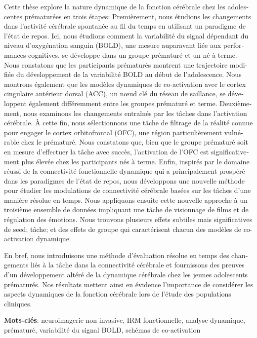 \begin{otherlanguage}{french}
\hspace{1cm}Cette thèse explore la nature dynamique de la fonction cérébrale chez les adolescentes prématurées en trois étapes: Premièrement, nous étudions les changements dans l'activité cérébrale spontanée au fil du temps en utilisant un paradigme de l'état de repos. Ici, nous étudions comment la variabilité du signal dépendant du niveau d'oxygénation sanguin (BOLD), une mesure auparavant liée aux performances cognitives, se développe dans un groupe prématuré et un né à terme. Nous constatons que les participants prématurés montrent une trajectoire modifiée du développement de la variabilité BOLD au début de l'adolescence. Nous montrons également que les modèles dynamiques de co-activation avec le cortex cingulaire antérieur dorsal (ACC), un nœud clé du réseau de saillance, se développent également différemment entre les groupes prématuré et terme. Deuxièmement, nous examinons les changements entraînés par les tâches dans l'activation cérébrale. À cette fin, nous sélectionnons une tâche de filtrage de la réalité connue pour engager le cortex orbitofrontal (OFC), une région particulièrement vulnérable chez le prématuré. Nous constatons que, bien que le groupe prématuré soit en mesure d'effectuer la tâche avec succès, l'activation de l'OFC est significativement plus élevée chez les participants nés à terme. Enfin, inspirés par le domaine réussi de la connectivité fonctionnelle dynamique qui a principalement prospéré dans les paradigmes de l'état de repos, nous développons une nouvelle méthode pour étudier les modulations de connectivité cérébrale basées sur les tâches d'une manière résolue en temps. Nous appliquons ensuite cette nouvelle approche à un troisième ensemble de données impliquant une tâche de visionnage de films et de régulation des émotions. Nous trouvons plusieurs effets subtiles mais significatives de seed; tâche; et des effets de groupe qui caractérisent chacun des modèles de co-activation dynamique.

\hspace{1cm}En bref, nous introduisons une méthode d'évaluation résolue en temps des changements liés à la tâche dans la connectivité cérébrale et fournissons des preuves d'un développement altéré de la dynamique cérébrale chez les jeunes adolescents prématurés. Nos résultats mettent ainsi en évidence l'importance de considérer les aspects dynamiques de la fonction cérébrale lors de l'étude des populations cliniques.


\vspace{0.5cm}
\textbf{Mots-clés}: neuroimagerie non invasive, IRM fonctionnelle, analyse dynamique, prématuré, variabilité du signal BOLD, schémas de co-activation



\end{otherlanguage}


